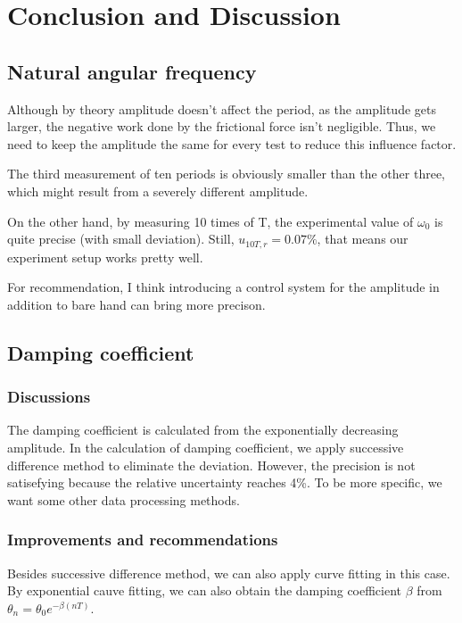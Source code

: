\section{Conclusion and Discussion}

\subsection{Natural angular frequency}

Although by theory amplitude doesn't affect the period, as the amplitude gets
larger, the negative work done by the frictional force isn't negligible.  
Thus, we need to keep the amplitude the same for every test to reduce this
influence factor.

The third measurement of ten periods is obviously smaller than the other three,
which might result from a severely different amplitude.

On the other hand, by measuring 10 times of T, the experimental value of
$\omega_0$ is quite precise (with small deviation).
Still, $u_{10T,r}=0.07\%$, that means our experiment setup works pretty well.

For recommendation, I think introducing a control system for the amplitude in
addition to bare hand can bring more precison.

\subsection{Damping coefficient}

\subsubsection{Discussions}

The damping coefficient is calculated from the exponentially decreasing
amplitude. In the calculation of damping coefficient, we apply successive
difference method to eliminate the deviation. However, the precision is not
satisefying because the relative uncertainty reaches 4\%. To be more specific,
we want some other data processing methods. 

\subsubsection{Improvements and recommendations}

Besides successive difference method, we can also apply curve fitting in this
case. By exponential cauve fitting, we can also obtain the damping coefficient
$\beta$ from $\theta_n=\theta_0e^{-\beta (nT)}$. 
	
